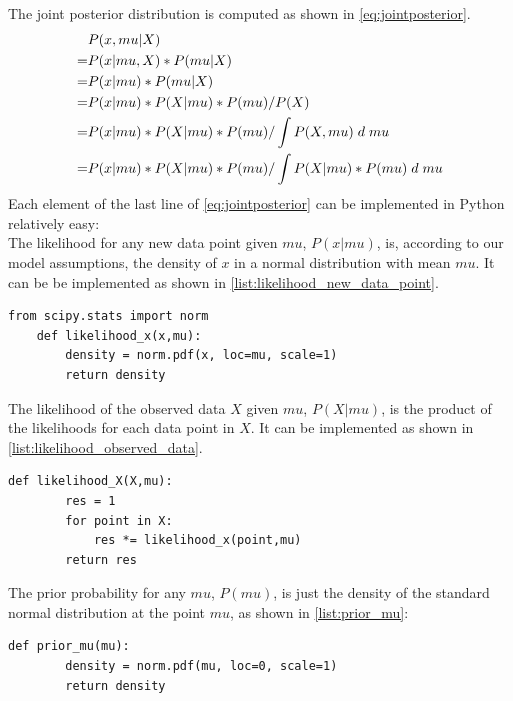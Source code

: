 \documentclass{article}
\begin{document}
The joint posterior distribution is computed as shown in \autoref{eq:jointposterior}.
\begin{equation}
\label{eq:jointposterior}
\begin{split}
&P(x,mu|X) \\
= &P(x|mu,X) * P(mu|X) \\
= &P(x|mu) * P(mu|X) \\
= &P(x|mu) * P(X|mu) * P(mu) / P(X) \\
= &P(x|mu) * P(X|mu) * P(mu) / \int P(X,mu) \hspace{1mm} d \hspace{1mm} mu \\
= &P(x|mu) * P(X|mu) * P(mu) / \int P(X|mu) * P(mu) \hspace{1mm} d \hspace{1mm} mu
\end{split}
\end{equation}
Each element of the last line of \autoref{eq:jointposterior} can be implemented in Python relatively easy: 
\\
The likelihood for any new data point given $mu$, $P(x|mu)$, is, according to our model assumptions, the density of $x$ in a normal distribution with mean $mu$. It can be be implemented as shown in \autoref{list:likelihood_new_data_point}.
\begin{lstlisting}[caption={Implementation of the likelihood for one data point}, label={list:likelihood_new_data_point},captionpos=b]
    from scipy.stats import norm
    def likelihood_x(x,mu):
        density = norm.pdf(x, loc=mu, scale=1)
        return density
\end{lstlisting}
The likelihood of the observed data $X$ given $mu$, $P(X|mu)$, is the product of the likelihoods for each data point in $X$. It can be implemented as shown in \autoref{list:likelihood_observed_data}.
\begin{lstlisting}[caption={Implementation of the likelihood for the observed data}, label={list:likelihood_observed_data},captionpos=b]
    def likelihood_X(X,mu):
        res = 1
        for point in X:
            res *= likelihood_x(point,mu)
        return res
\end{lstlisting}
The prior probability for any $mu$, $P(mu)$, is just the density of the standard normal distribution at the point $mu$, as shown in \autoref{list:prior_mu}:
\begin{lstlisting}[caption={Implementation of the prior for mu}, label={list:prior_mu},captionpos=b]
    def prior_mu(mu):
        density = norm.pdf(mu, loc=0, scale=1)
        return density
\end{lstlisting}
\end{document}
